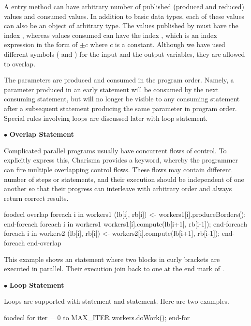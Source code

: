 A entry method can have arbitrary number of published (produced and reduced)
values and consumed values. In addition to basic data types, each of these
values can also be an object of arbitrary type. The values published by
 must have the index , whereas values consumed can have the
index , which is an index expression in the form of $\pm c$
where $c$ is a constant. Although we have used different symbols ( and
) for the input and the output variables, they are allowed to overlap. 

The parameters are produced and consumed in the program order. Namely, a
parameter produced in an early statement will be consumed by the next consuming
statement, but will no longer be visible to any consuming statement after a 
subsequent statement producing the same parameter in program order.
Special rules involving loops are discussed later with loop statement.

$\bullet$ {\bf Overlap Statement}

Complicated parallel programs usually have concurrent flows of control. To
explicitly express this, Charisma provides a  keyword, whereby the
programmer can fire multiple overlapping control flows. These flows may contain
different number of steps or statements, and their execution should be
independent of one another so that their progress can interleave with arbitrary
order and always return correct results. 

\begin{SaveVerbatim}{foodecl}
  overlap
  {
    foreach i in workers1
      (lb[i], rb[i]) <- workers1[i].produceBorders();
    end-foreach
    foreach i in workers1
      workers1[i].compute(lb[i+1], rb[i-1]);
    end-foreach
  }
  {
    foreach i in workers2
      (lb[i], rb[i]) <- workers2[i].compute(lb[i+1], rb[i-1]);
    end-foreach
  }
  end-overlap
\end{SaveVerbatim}

This example shows an  statement where two blocks in curly
brackets are executed in parallel. Their execution join back to one at the end
mark of . 

$\bullet$ {\bf Loop Statement}

Loops are supported with  statement and  statement. Here
are two examples.
\begin{SaveVerbatim}{foodecl}
  for iter = 0 to MAX_ITER
     workers.doWork();
  end-for
\end{SaveVerbatim}
  
